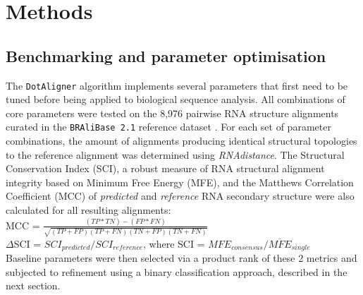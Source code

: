 \documentclass{bmcart}
\newcommand\dotaligner{\texttt{DotAligner}}
\newcommand\bralibase{\texttt{BRAliBase 2.1}}
\begin{document}
\section*{Methods} 
\subsection*{Benchmarking and parameter optimisation}

The \dotaligner{} algorithm implements several parameters that
first need to be tuned before being applied to biological sequence
analysis. All combinations of core parameters were tested on the 8,976
pairwise RNA structure alignments curated in the \bralibase{} reference dataset
\cite{wilm2006enhanced}. For each set of parameter combinations, the amount of
alignments producing identical structural topologies to the reference alignment
was determined using \textit{RNAdistance}. The Structural Conservation Index
(SCI), a robust measure of RNA structural alignment integrity
\cite{gruber2008strategies} based on Minimum Free Energy (MFE), and the Matthews Correlation Coefficient (MCC) of \textit{predicted} and \textit{reference} RNA secondary structure
were also calculated for all resulting alignments: \\

MCC = $\frac{(TP * TN) - (FP * FN)}{ \sqrt{ (TP + FP)(TP + FN)(TN + FP)(TN + FN) }}$\\

$\Delta$SCI = $SCI_{predicted} / SCI_{reference}$, where SCI = $ MFE_{consensus}  / \overline{MFE}_{single}  $\\

Baseline parameters were then selected via a product rank of these 2 metrics 
and subjected to refinement using a binary classification approach, described in the next section. 
\end{document}
